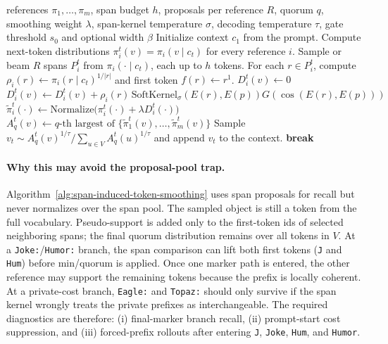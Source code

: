 \documentclass[11pt]{article}
\begin{document}
\begin{algorithm}[htbp]
\caption{Span-induced token smoothing}
\label{alg:span-induced-token-smoothing}
\begin{algorithmic}[1]
\Require references $\pi_1,\dots,\pi_m$, span budget $h$, proposals per reference $R$, quorum $q$, smoothing weight $\lambda$, span-kernel temperature $\sigma$, decoding temperature $\tau$, gate threshold $s_0$ and optional width $\beta$
\State Initialize context $c_1$ from the prompt.
    \State Compute next-token distributions $\pi_i^t(v)=\pi_i(v\mid c_t)$ for every reference $i$.
        \State Sample or beam $R$ spans $P_i^t$ from $\pi_i(\cdot\mid c_t)$, each up to $h$ tokens.
        \State For each $r\in P_i^t$, compute $\rho_i(r)\gets\pi_i(r\mid c_t)^{1/|r|}$ and first token $f(r)\gets r^1$.
    \EndFor
        \State $D_i^t(v)\gets 0$
            \State $D_i^t(v)\gets D_i^t(v)+\rho_i(r)\,\mathrm{SoftKernel}_\sigma(E(r),E(p))G(\cos(E(r),E(p)))$
        \EndFor
    \EndFor
        \State $\widetilde \pi_i^t(\cdot)\gets \mathrm{Normalize}\bigl(\pi_i^t(\cdot)+\lambda D_i^t(\cdot)\bigr)$
    \EndFor
        \State $A_q^t(v)\gets q\text{-th largest of }\{\widetilde \pi_1^t(v),\dots,\widetilde \pi_m^t(v)\}$
    \EndFor
    \State Sample $v_t\sim A_q^t(v)^{1/\tau}/\sum_{u\in V}A_q^t(u)^{1/\tau}$ and append $v_t$ to the context.
        \State \textbf{break}
    \EndIf
\EndFor
\end{algorithmic}
\end{algorithm}

\paragraph{Why this may avoid the proposal-pool trap.} Algorithm~\ref{alg:span-induced-token-smoothing} uses span proposals for recall but never normalizes over the span pool. The sampled object is still a token from the full vocabulary. Pseudo-support is added only to the first-token ids of selected neighboring spans; the final quorum distribution remains over all tokens in $V$. At a \texttt{Joke:}/\texttt{Humor:} branch, the span comparison can lift both first tokens (\texttt{J} and \texttt{Hum}) before min/quorum is applied. Once one marker path is entered, the other reference may support the remaining tokens because the prefix is locally coherent. At a private-cost branch, \texttt{Eagle:} and \texttt{Topaz:} should only survive if the span kernel wrongly treats the private prefixes as interchangeable. The required diagnostics are therefore: (i) final-marker branch recall, (ii) prompt-start cost suppression, and (iii) forced-prefix rollouts after entering \texttt{J}, \texttt{Joke}, \texttt{Hum}, and \texttt{Humor}.
\end{document}
